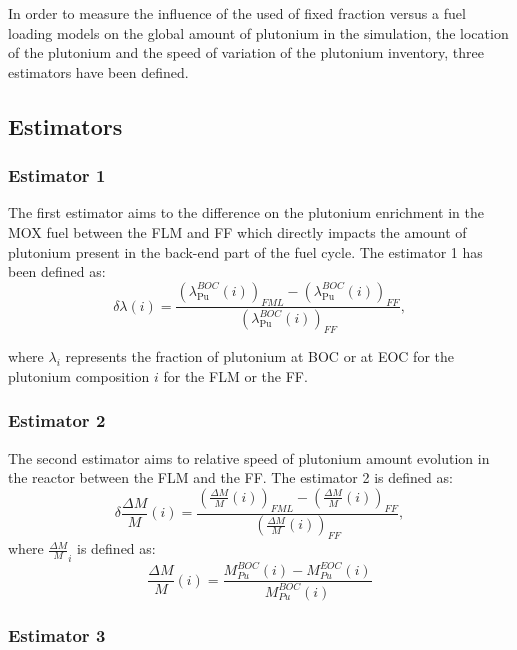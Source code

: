 In order to measure the influence of the used of fixed fraction versus a fuel
loading models on the global amount of plutonium in the simulation, the location
of the plutonium and the speed of variation of the plutonium inventory, three
estimators have been defined.

\subsection{Estimators}
\subsubsection{Estimator 1}
The first estimator aims to the difference on the plutonium enrichment in the MOX
fuel between the \gls{FLM} and \gls{FF} which directly impacts the amount of
plutonium present in the back-end part of the fuel cycle. The estimator 1 has
been defined as:
\begin{equation}
    \delta{\lambda}(i) =
        \frac{\left(\lambda_{\mathrm{Pu}}^{BOC}(i)\right)_{FML}
              - \left(\lambda_{\mathrm{Pu}}^{BOC}(i)\right)_{FF}}
              {\left(\lambda_{\mathrm{Pu}}^{BOC}(i)\right)_{FF}},
\end{equation}

where $\lambda_i$ represents the fraction of plutonium at \gls{BOC} or at
\gls{EOC} for the plutonium composition $i$ for the \gls{FLM} or the \gls{FF}.

\subsubsection{Estimator 2}
The second estimator aims to relative speed of plutonium amount evolution in the
reactor between the \gls{FLM} and the \gls{FF}. The estimator 2 is defined as:
\begin{equation}
    \delta{\frac{\Delta M}{M}}(i) =
        \frac{\left(\frac{\Delta M}{M}(i)\right)_{FML}
              - \left(\frac{\Delta M}{M}(i)\right)_{FF}}
             {\left(\frac{\Delta M}{M}(i)\right)_{FF}},
\end{equation}
where $\frac{\Delta M}{M}_{i}$ is defined as:
\begin{equation}
    \frac{\Delta M}{M}(i) = \frac{M_{Pu}^{BOC}(i) -
    M_{Pu}^{EOC}(i)}{M_{Pu}^{BOC}(i)}
\end{equation}


\subsubsection{Estimator 3}


